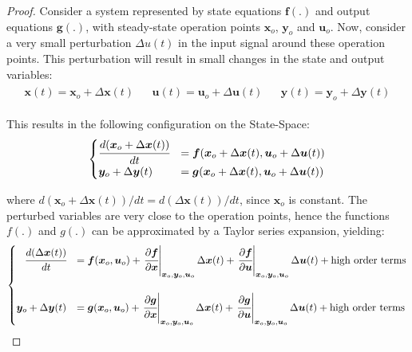 \documentclass[a4paper,11pt]{book}
\numberwithin{figure}{chapter}
\numberwithin{equation}{chapter}
\numberwithin{table}{chapter}
\theoremstyle{definition}
\begin{document}
\begin{proof}
	Consider a system represented by state equations $\bm{f}(.)$ and output equations $\bm{g}(.)$, with steady-state operation points $\bm{x}_o$, $\bm{y}_o$ and $\bm{u}_o$. Now, consider a very small perturbation $\Delta u(t)$ in the input signal around these operation points. This perturbation will result in small changes in the state and output variables:
	\begin{align}
	\begin{matrix}
		\bm{x}(t) = \bm{x}_o + \Delta \bm{x}(t) & &
		\bm{u}(t) = \bm{u}_o + \Delta \bm{u}(t) & &
		\bm{y}(t) = \bm{y}_o + \Delta \bm{y}(t)
	\end{matrix}
	\end{align}
	
	This results in the following configuration on the State-Space:
	\begin{align}
	\begin{cases}
		\cfrac{d(\bm{x}_o + \Delta \bm{x}(t))}{dt} &= \bm{f}(\bm{x}_o + \Delta \bm{x}(t), \bm{u}_o + \Delta \bm{u}(t) ) \\
		\bm{y}_o + \Delta \bm{y}(t) &= \bm{g}(\bm{x}_o + \Delta \bm{x}(t), \bm{u}_o + \Delta \bm{u}(t) ) \\
	\end{cases}
	\end{align}
	
	\noindent where $d(\bm{x}_o + \Delta \bm{x}(t)) / dt = d(\Delta \bm{x}(t)) / dt$, since $\bm{x}_o$ is constant. The perturbed variables are very close to the operation points, hence the functions $f(.)$ and $g(.)$ can be approximated by a Taylor series expansion, yielding:
	\begin{align}
	\begin{cases}
		\hfill \cfrac{d(\Delta \bm{x}(t))}{dt} &= \bm{f}(\bm{x}_o, \bm{u}_o) + \left. \cfrac{\partial \bm{f}}{\partial \bm{x}}\right\vert_{\bm{x}_o, \bm{y}_o, \bm{u}_o} \Delta \bm{x}(t) + \left. \cfrac{\partial \bm{f}}{\partial \bm{u}}\right\vert_{\bm{x}_o, \bm{y}_o, \bm{u}_o}  \Delta \bm{u}(t) + \text{high order terms} \\ \\
		\bm{y}_o + \Delta \bm{y}(t) &= \bm{g}(\bm{x}_o, \bm{u}_o) + \left. \cfrac{\partial \bm{g}}{\partial \bm{x}}\right\vert_{\bm{x}_o, \bm{y}_o, \bm{u}_o} \Delta \bm{x}(t) + \left. \cfrac{\partial \bm{g}}{\partial \bm{u}}\right\vert_{\bm{x}_o, \bm{y}_o, \bm{u}_o}  \Delta \bm{u}(t) + \text{high order terms} \\
	\end{cases}
	\end{align}
	

\end{proof}
\end{document}
